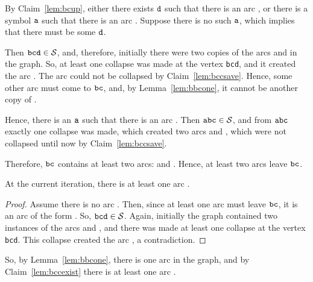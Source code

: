 By Claim~\ref{lem:bcup}, either there exists $ {\tt d} $ such that there is an arc , or there is a symbol $ {\tt a} $ such that there is an arc . Suppose there is no such $ {\tt a} $, which implies that there must be some $ {\tt d} $.

Then $ {\tt bcd} \in {\cal S} $, and, therefore, initially there were two copies of the arcs  and  in the graph. So, at least one collapse was made at the vertex {\tt bcd}, and it created the arc . The arc  could not be collapsed by Claim~\ref{lem:bccsave}. Hence, some other arc must come to $ {\tt bc} $, and, by Lemma~\ref{lem:bbcone}, it cannot be another copy of .

Hence, there is an $ {\tt a} $ such that there is an arc . Then $ {\tt abc} \in {\cal S} $, and from $ {\tt abc} $ exactly one collapse was made, which created two arcs  and , which were not collapsed until now by Claim~\ref{lem:bccsave}.

Therefore, $ {\tt bc} $ contains at least two arcs:  and . Hence, at least two arcs leave $ {\tt bc} $.

\begin{claim}
\label{lem:bccexist}
At the current iteration, there is at least one arc .
\end{claim}
\begin{proof}
Assume there is no arc . Then, since at least one arc must leave $ {\tt bc} $, it is an arc of the form . So, $ {\tt bcd} \in {\cal S} $. Again, initially the graph contained two instances of the arcs  and , and there was made at least one collapse at the vertex {\tt bcd}. This collapse created the arc , a contradiction.
\end{proof}

So, by Lemma~\ref{lem:bbcone}, there is one arc  in the graph, and by Claim~\ref{lem:bccexist} there is at least one arc .

